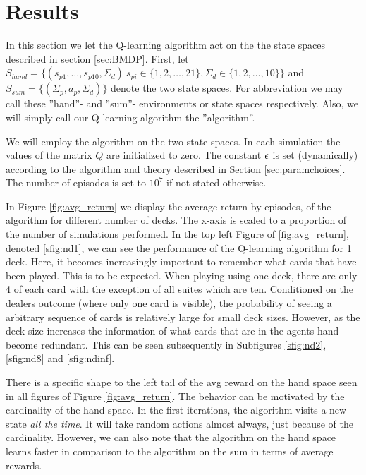 \section{Results}\label{sec:results}
In this section we let the Q-learning algorithm act on the the state spaces described in section \ref{sec:BMDP}. First, let $S_{hand}=\{  (s_{p1},\ldots,s_{p10},\Sigma_{d})\ s_{pi} \in \{1,2,\ldots, 21 \}, \Sigma_{d}\in \{1,2,\ldots, 10 \} \}$ and $S_{sum}=\{  (\Sigma_p, a_p, \Sigma_d )  \}$ denote the two state spaces. For abbreviation we may call these ''hand''- and ''sum''- environments or state spaces respectively. Also, we will simply call our Q-learning algorithm the ''algorithm''.

We will employ the algorithm on the two state spaces. In each simulation the values of the matrix $Q$ are initialized to zero. The constant $\epsilon$ is set (dynamically) according to the algorithm and theory described in Section \ref{sec:paramchoices}. The number of episodes is set to $10^7$ if not stated otherwise. 

In Figure \ref{fig:avg_return} we display the average return by episodes, of the algorithm for different number of decks. The x-axis is scaled to a proportion of the number of simulations performed. In the top left Figure of \ref{fig:avg_return}, denoted \ref{sfig:nd1}, we can see the performance of the Q-learning algorithm for 1 deck. Here, it becomes increasingly important to remember what cards that have been played. This is to be expected. When playing using one deck, there are only 4 of each card with the exception of all suites which are ten. Conditioned on the dealers outcome (where only one card is visible), the probability of seeing a arbitrary sequence of cards is relatively large for small deck sizes. However, as the deck size increases the information of what cards that are in the agents hand become redundant. This can be seen subsequently in Subfigures \ref{sfig:nd2}, \ref{sfig:nd8} and \ref{sfig:ndinf}. 

There is a specific shape to the left tail of the avg reward on the hand space seen in all figures of Figure \ref{fig:avg_return}. The behavior can be motivated by the cardinality of the hand space. In the first iterations, the algorithm visits a new state \textit{all the time}. It will take random actions almost always, just because of the cardinality. However, we can also note that the algorithm on the hand space learns faster in comparison to the algorithm on the sum in terms of average rewards. 
   
